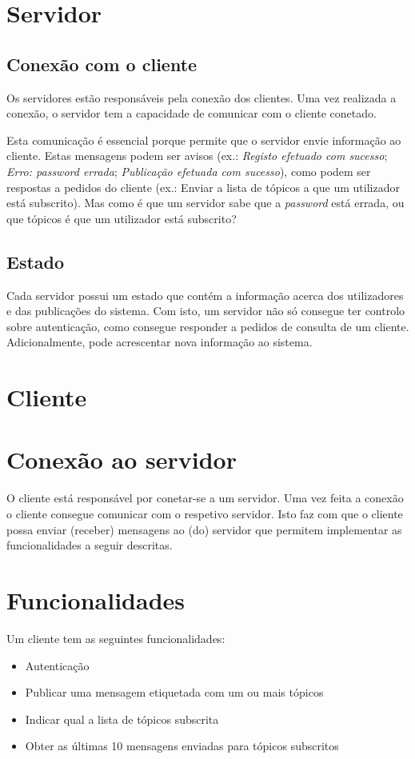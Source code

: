 \documentclass[12pt, a4paper]{report}
\begin{document}
\section{Servidor}
\subsection{Conexão com o cliente}
Os servidores estão responsáveis pela conexão dos clientes. Uma vez realizada a conexão, o servidor tem a capacidade de comunicar com o cliente conetado.

Esta comunicação é essencial porque permite que o servidor envie informação ao cliente.
Estas mensagens podem ser avisos (ex.: \textit{Registo efetuado com sucesso}; \textit{Erro: password errada}; \textit{Publicação efetuada com sucesso}), como podem ser respostas a pedidos do cliente (ex.: Enviar a lista de tópicos a que um utilizador está subscrito).
Mas como é que um servidor sabe que a \textit{password} está errada, ou que tópicos é que um utilizador está subscrito? 

\subsection{Estado}
Cada servidor possui um estado que contém a informação acerca dos utilizadores e das publicações do sistema.
Com isto, um servidor não só consegue ter controlo sobre autenticação, como consegue responder a pedidos de consulta de um cliente. Adicionalmente, pode acrescentar nova informação ao sistema.

\section{Cliente}
\section{Conexão ao servidor}
O cliente está responsável por conetar-se a um servidor. Uma vez feita a conexão o cliente consegue comunicar com o respetivo servidor.
Isto faz com que o cliente possa enviar (receber) mensagens ao (do) servidor que permitem implementar as funcionalidades a seguir descritas.

\section{Funcionalidades}
Um cliente tem as seguintes funcionalidades:
\begin{itemize}
    \item Autenticação
    \item Publicar uma mensagem etiquetada com um ou mais tópicos
    \item Indicar qual a lista de tópicos subscrita
    \item Obter as últimas 10 mensagens enviadas para tópicos subscritos
\end{itemize}
\end{document}
